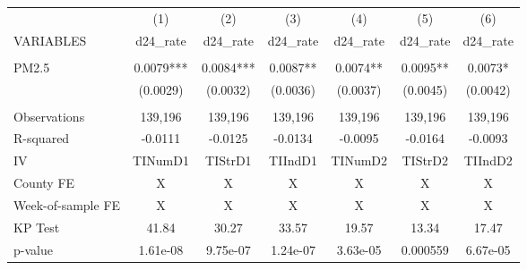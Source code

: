 \begin{tabular}{lcccccc} \hline
 & (1) & (2) & (3) & (4) & (5) & (6) \\
VARIABLES & d24\_rate & d24\_rate & d24\_rate & d24\_rate & d24\_rate & d24\_rate \\ \hline
 &  &  &  &  &  &  \\
PM2.5 & 0.0079*** & 0.0084*** & 0.0087** & 0.0074** & 0.0095** & 0.0073* \\
 & (0.0029) & (0.0032) & (0.0036) & (0.0037) & (0.0045) & (0.0042) \\
 &  &  &  &  &  &  \\
Observations & 139,196 & 139,196 & 139,196 & 139,196 & 139,196 & 139,196 \\
R-squared & -0.0111 & -0.0125 & -0.0134 & -0.0095 & -0.0164 & -0.0093 \\
IV & TINumD1 & TIStrD1 & TIIndD1 & TINumD2 & TIStrD2 & TIIndD2 \\
County FE & X & X & X & X & X & X \\
Week-of-sample FE & X & X & X & X & X & X \\
KP Test & 41.84 & 30.27 & 33.57 & 19.57 & 13.34 & 17.47 \\
 p-value & 1.61e-08 & 9.75e-07 & 1.24e-07 & 3.63e-05 & 0.000559 & 6.67e-05 \\ \hline
\end{tabular}
